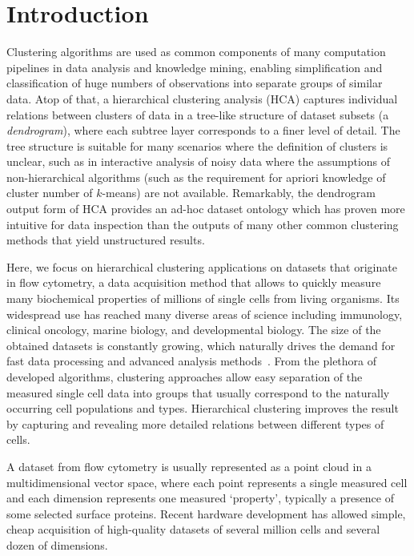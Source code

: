 \section{Introduction}

Clustering algorithms are used as common components of many computation pipelines in data analysis and knowledge mining, enabling simplification and classification of huge numbers of observations into separate groups of similar data.
Atop of that, a hierarchical clustering analysis (HCA) captures individual relations between clusters of data in a tree-like structure of dataset subsets (a \emph{dendrogram}), where each subtree layer corresponds to a finer level of detail.
The tree structure is suitable for many scenarios where the definition of clusters is unclear, such as in interactive analysis of noisy data where the assumptions of non-hierarchical algorithms (such as the requirement for apriori knowledge of cluster number of $k$-means) are not available.
Remarkably, the dendrogram output form of HCA provides an ad-hoc dataset ontology which has proven more intuitive for data inspection than the outputs of many other common clustering methods that yield unstructured results.

Here, we focus on hierarchical clustering applications on datasets that originate in flow cytometry, a data acquisition method that allows to quickly measure many biochemical properties of millions of single cells from living organisms.
Its widespread use has reached many diverse areas of science including immunology, clinical oncology, marine biology, and developmental biology.
The size of the obtained datasets is constantly growing, which naturally drives the demand for fast data processing and advanced analysis methods~\cite{lugli2010data}.
From the plethora of developed algorithms, clustering approaches allow easy separation of the measured single cell data into groups that usually correspond to the naturally occurring cell populations and types.
Hierarchical clustering improves the result by capturing and revealing more detailed relations between different types of cells.

A dataset from flow cytometry is usually represented as a point cloud in a multidimensional vector space, where each point represents a single measured cell and each dimension represents one measured `property', typically a presence of some selected surface proteins.
Recent hardware development has allowed simple, cheap acquisition of high-quality datasets of several million cells and several dozen of dimensions.

